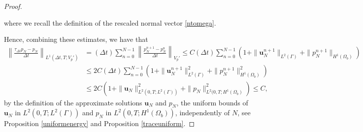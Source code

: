 \documentclass[10pt,a4paper]{amsart}
\newcommand{\bd}{\boldsymbol}
\begin{document}
\begin{proof}
\begin{itemize}
\begin{equation*}
\end{equation*}
where we recall the definition of the rescaled normal vector \eqref{ntomega}. 
\end{itemize}
Hence, combining these estimates, we have that
\begin{align*}
\left\|\frac{\tau_{\Delta t} p_{N} - p_{N}}{\Delta t}\right\|_{L^{1}(\Delta t, T; V_{p}')} &= (\Delta t) \sum_{n = 0}^{N - 1} \left\|\frac{p^{n + 1}_{N} - p^{n}_{N}}{\Delta t}\right\|_{V_{p}'} \le C(\Delta t) \sum_{n = 0}^{N - 1} \left(1 + \|\bd{u}^{n + 1}_{N}\|_{L^{2}(\Gamma)} + \|p^{n + 1}_{N}\|_{H^{1}(\Omega_{b})} \right) \\
&\le 2C(\Delta t) \sum_{n = 0}^{N - 1} \left(1 + \|\bd{u}^{n + 1}_{N}\|^{2}_{L^{2}(\Gamma)} + \|p^{n + 1}_{N}\|^{2}_{H^{1}(\Omega_{b})}\right) \\
&\le 2C\left(1 + \|\bd{u}_{N}\|^{2}_{L^{2}(0, T; L^{2}(\Gamma))} + \|p_{N}\|_{L^{2}(0, T; H^{1}(\Omega_{b})}^{2}\right) \le C,
\end{align*}
by the definition of the approximate solutions $\bd{u}_{N}$ and $p_{N}$, the uniform bounds of $\bd{u}_{N}$ in $L^{2}(0, T; L^{2}(\Gamma))$ and $p_{N}$ in $L^{2}(0, T; H^{1}(\Omega_{b}))$, independently of $N$, see Proposition \ref{uniformenergy} and Proposition \ref{traceuniform}.
\end{proof}
\end{document}

